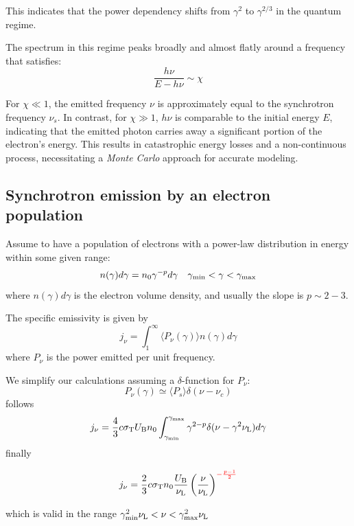 This indicates that the power dependency shifts from \( \gamma^2 \) to \( \gamma^{2/3} \) in the quantum regime.

The spectrum in this regime peaks broadly and almost flatly around a frequency that satisfies:
%
\[
\frac{h\nu}{E - h\nu} \sim \chi
\]

For \( \chi \ll 1 \), the emitted frequency \( \nu \) is approximately equal to the synchrotron frequency \( \nu_s \). In contrast, for \( \chi \gg 1 \), \( h\nu \) is comparable to the initial energy \( E \), indicating that the emitted photon carries away a significant portion of the electron's energy. This results in catastrophic energy losses and a non-continuous process, necessitating a \emph{Monte Carlo} approach for accurate modeling.

\subsection{Synchrotron emission by an electron population}

Assume to have a population of electrons with a power-law distribution in energy within some given range:
%
\[
n(\gamma) d\gamma = n_0 \gamma^{-p} d\gamma \quad \gamma_{\rm min} < \gamma < \gamma_{\rm max} 
\]	
%
where $n(\gamma) d\gamma$ is the electron volume density, and usually the slope is $p \sim 2-3$.

The specific emissivity is given by
%
\begin{equation*}
j_\nu = \int_1^\infty \langle P_\nu(\gamma) \rangle n(\gamma) d\gamma
\end{equation*}
%
where $P_\nu$ is the power emitted per unit frequency.

We simplify our calculations assuming a $\delta$-function for $P_\nu$:
%
\begin{equation*}
P_\nu(\gamma) \simeq \langle P_s \rangle \delta(\nu - \nu_c)
\end{equation*}
%
follows
%
\begin{equation*}
j_\nu = \frac{4}{3} c \sigma_{\rm T} U_{\rm B} n_0 \int_{\gamma_{\rm min}}^{\gamma_{\rm max}} \gamma^{2-p} \delta(\nu - \gamma^2 \nu_{\rm L}) d\gamma
\end{equation*}
%
finally
%
\begin{remark}
\[ 
j_\nu = \frac{2}{3} c \sigma_{\rm T} n_0 \frac{U_{\rm B}}{\nu_{\rm L}} \left( \frac{\nu}{\nu_{\rm L}} \right)^{\color{red}-\frac{p-1}{2}}
\]
\end{remark}
%
which is valid in the range $\gamma^2_{\rm min} \nu_{\rm L} < \nu < \gamma^2_{\rm max} \nu_{\rm L}$

